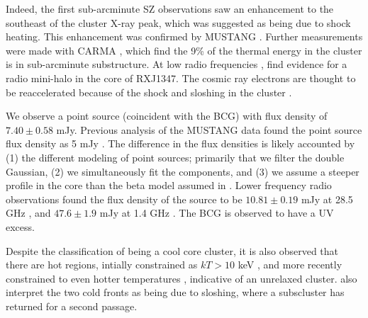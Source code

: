 \documentclass[iop,numberedappendix,apj]{emulateapj}
\begin{document}
Indeed, the first sub-arcminute SZ observations \citep{komatsu2001,kitayama2004} saw an enhancement to
the southeast of the cluster X-ray peak, which was suggested as being due to shock heating. This enhancement
was confirmed by MUSTANG \citep{mason2010}. Further measurements were made with CARMA \citep{plagge2013},
which find the 9\% of the thermal energy in the cluster is in sub-arcminute substructure.
At low radio frequencies \citep[][237 MHz and 614 MHz]{ferrari2011},
\citep[][1.4 GHz]{gitti2007a} find evidence for a radio mini-halo in the core of RXJ1347. The cosmic ray electrons
are thought to be reaccelerated because of the shock and sloshing in the cluster \citep{ferrari2011}.

We observe a point source (coincident with the BCG) with flux density of $7.40 \pm 0.58$ mJy. Previous analysis of 
the MUSTANG data found the point source flux density as 5 mJy \citep{mason2010}. The difference in the flux 
densities is likely accounted by (1) the different modeling of point sources; primarily that we filter the double 
Gaussian, (2) we simultaneously fit the components, and (3) we assume a steeper profile in the core than the beta 
model assumed in \citet{mason2010}. Lower frequency radio observations found the flux density of the source to be 
$10.81 \pm 0.19$ mJy at 28.5 GHz \citep{reese2002}, and $47.6 \pm 1.9$ mJy at 1.4 GHz \citep{condon1998}. The BCG 
is observed to have a UV excess\citep{donahue2015}. 

Despite
the classification of being a cool core cluster, it is also observed that there are hot regions, intially
constrained as $kT > 10$ keV \citep[e.g.][]{allen2002,bradac2008}, and more recently constrained to even
hotter temperatures \citep[$kT > 20$ keV][]{johnson2012}, indicative of an unrelaxed cluster. 
\citet{johnson2012} also interpret the two cold fronts as being due to sloshing, where a subscluster has returned
for a second passage.


\end{document}
